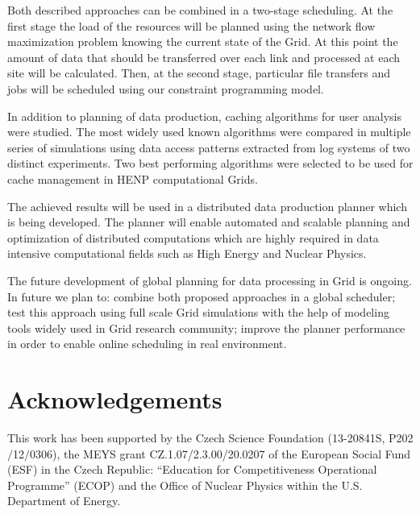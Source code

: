 \documentclass[english]{ddny}
\begin{document}
Both described approaches can be combined in a two-stage scheduling. At the first stage the load of the resources will be planned using the network flow maximization problem knowing the current state of the Grid. At this point the amount of data that should be transferred over each link and processed at each site will be calculated. Then, at the second stage, particular file transfers and jobs will be scheduled using our constraint programming model. 

In addition to planning of data production, caching algorithms for user analysis were studied. The most widely used known algorithms were compared in multiple series of simulations using data access patterns extracted from log systems of two distinct experiments. Two best performing algorithms were selected to be used for cache management in HENP computational Grids. 

The achieved results will be used in a distributed data production planner which is being developed. The planner will enable automated and scalable planning and optimization of distributed computations which are highly required in data intensive computational fields such as High Energy and Nuclear Physics.

The future development of global planning for data processing in Grid is ongoing. In future we plan to:
combine both proposed approaches in a global scheduler;
test this approach using full scale Grid simulations with the help of modeling tools widely used in Grid research community;
improve the planner performance in order to enable online scheduling in real environment. 


\section*{Acknowledgements}
This work has been supported by the Czech Science Foundation
(13-20841S, P202$/$12$/$0306),  the MEYS grant CZ.1.07/2.3.00/20.0207 of the European Social Fund (ESF) in the Czech Republic: “Education for Competitiveness Operational Programme” (ECOP) and the Office of Nuclear Physics within the U.S. Department of Energy.  




{}


		
\end{document}
